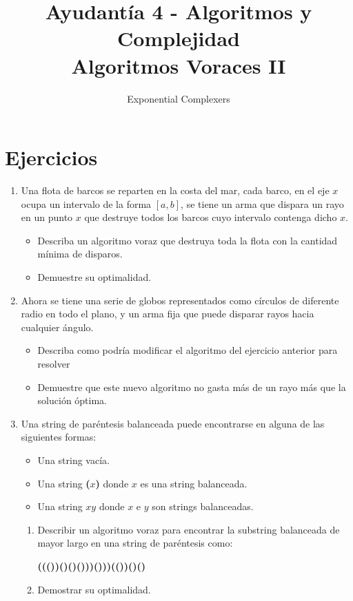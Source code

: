 \documentclass[spanish, fleqn]{article}
\title{Ayudantía 4 - Algoritmos y Complejidad\\
Algoritmos Voraces II}
\author{Exponential Complexers}
\date{}
\begin{document}
\maketitle

\thispagestyle{empty}
\section{Ejercicios}
\begin{enumerate}
\item Una flota de barcos se reparten en la costa del mar, cada barco, en el eje $x$ ocupa un intervalo de la forma $[a,b]$, se tiene un arma que dispara un rayo en un punto $x$ que destruye todos los barcos cuyo intervalo contenga dicho $x$.
\begin{itemize}
\item Describa un algoritmo voraz que destruya toda la flota con la cantidad mínima de disparos.
\item Demuestre su optimalidad.
\end{itemize}
\item Ahora se tiene una serie de globos representados como círculos de diferente radio en todo el plano, y un arma fija que puede disparar rayos hacia cualquier ángulo.
\begin{itemize}
\item Describa como podría modificar el algoritmo del ejercicio anterior para resolver 
\item Demuestre que este nuevo algoritmo no gasta más de un rayo más que la solución óptima.
\end{itemize}
\item Una string de paréntesis balanceada puede encontrarse en alguna de las siguientes formas:
\begin{itemize}
\item Una string vacía.
\item Una string \textbf{(}$x$\textbf{)} donde $x$ es una string balanceada.
\item Una string $xy$ donde $x$ e $y$ son strings balanceadas.
\end{itemize}
\begin{enumerate}
\item Describir un algoritmo voraz para encontrar la substring balanceada de mayor largo en una string de paréntesis como:
\begin{center}
\textbf{((())()()()))()))(())()()}
\end{center}
\item Demostrar su optimalidad.
\end{enumerate}
\end{enumerate}
\end{document}
